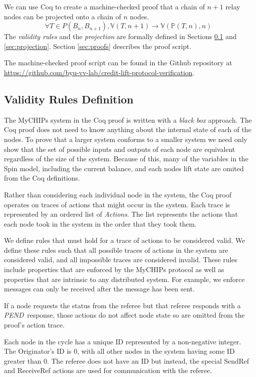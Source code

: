 \documentclass[runningheads]{llncs}
\newcommand{\pend}{\emph{PEND}}
\newcommand{\actsvalid}[2]{\mathds{V}(#1, #2)}
\newcommand{\projectsize}[2]{\mathds{P}(#1, #2)}
\newcommand{\coderepository}{Github repository at \url{https://github.com/byu-vv-lab/credit-lift-protocol-verification}}
\begin{document}
We can use Coq to create a machine-checked proof that a chain of $n+1$ relay nodes can be projected onto a chain of $n$ nodes.
$$\forall T \in P(B_n, B_{n+1}), 
\actsvalid{T}{n+1} \longrightarrow
\actsvalid{\projectsize{T}{n}}{n}$$
The \emph{validity rules} and the \emph{projection} are formally defined in Sections \ref{sec:definitions} and \ref{sec:projection}. Section \ref{sec:proofs} describes the proof script.

The machine-checked proof script can be found in the \coderepository.

\subsection{Validity Rules Definition} \label{sec:definitions}
The MyCHIPs system in the Coq proof is written with a \emph{black box} approach. The Coq proof does not need to know anything about the internal state of each of the nodes. To prove that a larger system conforms to a smaller system we need only show that the set of possible inputs and outputs of each node are equivalent regardless of the size of the system. Because of this, many of the variables in the Spin model, including the current balance, and each nodes lift state are omited from the Coq definitions. 

Rather than considering each individual node in the system, the Coq proof operates on traces of actions that might occur in the system. Each trace is represented by an ordered list of \emph{Actions}. The list represents the actions that each node took in the system in the order that they took them.

We define rules that must hold for a trace of actions to be considered valid. We define these rules such that all possible traces of actions in the system are considered valid, and all impossible traces are considered invalid. These rules include properties that are enforced by the MyCHIPs protocol as well as properties that are intrinsic to any distributed system. For example, we enforce  messages can only be received after the message has been sent.

If a node requests the status from the referee but that referee responds with a \pend\ response, those actions do not affect node state so are omitted from the proof's action trace.

Each node in the cycle has a unique ID represented by a non-negative integer. The Originator's ID is 0, with all other nodes in the system having some ID greater than 0. The referee does not have an ID but instead, the special SendRef and ReceiveRef actions are used for communication with the referee. 
\end{document}

